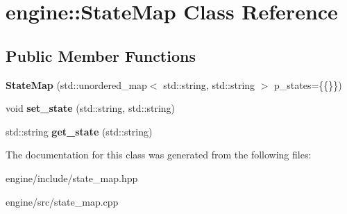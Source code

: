 \hypertarget{classengine_1_1_state_map}{}\section{engine\+:\+:State\+Map Class Reference}
\label{classengine_1_1_state_map}
\subsection*{Public Member Functions}
\begin{DoxyCompactItemize}
\item 
{\bfseries State\+Map} (std\+::unordered\+\_\+map$<$ std\+::string, std\+::string $>$ p\+\_\+states=\{\{\}\})\hypertarget{classengine_1_1_state_map_a9d49650e10a07c9be8573ef118fa56c8}{}\label{classengine_1_1_state_map_a9d49650e10a07c9be8573ef118fa56c8}

\item 
void {\bfseries set\+\_\+state} (std\+::string, std\+::string)\hypertarget{classengine_1_1_state_map_a1c8cce5f3ca6a05ab4be75f88785f866}{}\label{classengine_1_1_state_map_a1c8cce5f3ca6a05ab4be75f88785f866}

\item 
std\+::string {\bfseries get\+\_\+state} (std\+::string)\hypertarget{classengine_1_1_state_map_a05d2de75fb7d905cabca3c33fcca6d12}{}\label{classengine_1_1_state_map_a05d2de75fb7d905cabca3c33fcca6d12}

\end{DoxyCompactItemize}


The documentation for this class was generated from the following files\+:\begin{DoxyCompactItemize}
\item 
engine/include/state\+\_\+map.\+hpp\item 
engine/src/state\+\_\+map.\+cpp\end{DoxyCompactItemize}

